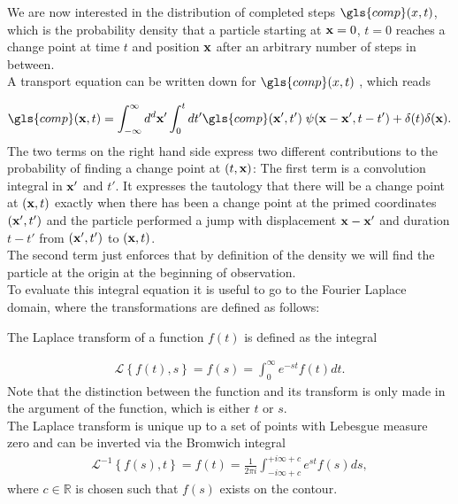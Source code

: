 We are now interested in the distribution of completed steps $\gls{comp}(x,t)$, which is the probability density that a particle starting at $\mathbf{ x }=0$, $t=0$ reaches a change point at time $t$ and position $\mathbf{ x }$ after an arbitrary number of steps in between. \\
A transport equation can be written down for $\gls{comp}(x,t)$ \cite{firstSteps}, which reads

\begin{align}
\gls{comp}(\ve{x},t) = \int_{-\infty}^{\infty} d^{d}\ve{x}' \int_{0}^{t} dt' \gls{comp}(\ve{x}',t')  \; \psi(\ve{x}-\ve{x}',t-t') + \delta(t) \delta(\ve{x}) . \label{eqn:CTransport}
\end{align}
%
The two terms on the right hand side express two different contributions to the probability of finding a change point at $(t,\mathbf{ x })$: The first term is a convolution integral in $\mathbf{ x' }$ and $t'$. It expresses the tautology that there will be a change point at $(\mathbf{ x },t)$ exactly when there has been a change point at the primed coordinates $(\mathbf{ x' },t')$ and the particle performed a jump with displacement $\mathbf{ x }-\mathbf{ x }'$ and duration $t-t'$ from $(\mathbf{ x' },t')$ to $(\mathbf{ x },t)$.  \\
The second term just enforces that by definition of the density we will find the particle at the origin at the beginning of observation. \\
To evaluate this integral equation it is useful to go to the Fourier Laplace domain, where the transformations are defined as follows:

The Laplace transform of a function $f(t)$ is defined as the integral 

\begin{align}
\mathcal{L} \left\{ f(t), s \right\} = f(s) = \int^{\infty}_{0} e^{-st} f(t) dt .
\end{align}
%
Note that the distinction between the function and its transform is only made in the argument of the function, which is either $t$ or $s$. \\
The Laplace transform is unique up to a set of points with Lebesgue measure zero and can be inverted via the Bromwich integral 
%
\begin{align}
\mathcal{L}^{-1} \left\{ f(s), t \right\} = f(t) = \frac{1}{2 \pi i} \int^{+i \infty + c}_{-i \infty + c} e^{st} f(s) ds, 
\end{align}
%
where $c \in \mathbb{R}$ is chosen such that $f(s)$ exists on the contour. 

